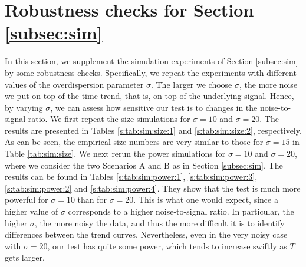 \documentclass[a4paper,12pt]{article}
\numberwithin{equation}{section}
\begin{document}
\section{Robustness checks for Section \ref{subsec:sim}}\label{s:subsec:robustness}


{\color{red} In this section,} we supplement the simulation experiments of Section \ref{subsec:sim} by some robustness checks. Specifically, we repeat the experiments with different values of the overdispersion parameter $\sigma$. The larger we choose $\sigma$, the more noise we put on top of the time trend, that is, on top of the underlying signal. Hence, by varying $\sigma$, we can assess how sensitive our test is to changes in the noise-to-signal ratio. We first repeat the size simulations for $\sigma = 10$ and $\sigma = 20$. The results are presented in Tables \ref{s:tab:sim:size:1} and \ref{s:tab:sim:size:2}, respectively. As can be seen, the empirical size numbers are very similar to those for $\sigma=15$ in Table \ref{tab:sim:size}. We next rerun the power simulations for $\sigma = 10$ and $\sigma = 20$, where we consider the two Scenarios A and B as in Section \ref{subsec:sim}. The results can be found {\color{red} in Tables \ref{s:tab:sim:power:1}, \ref{s:tab:sim:power:3}, \ref{s:tab:sim:power:2} and \ref{s:tab:sim:power:4}}. They show that the test is much more powerful for $\sigma=10$ than for $\sigma=20$. This is what one would expect, since a higher value of $\sigma$ corresponds to a higher noise-to-signal ratio. In particular, the higher $\sigma$, the more noisy the data, and thus the more difficult it is to identify differences between the trend curves. Nevertheless, even in the very noisy case with $\sigma = 20$, our test has quite some power, which tends to increase swiftly as $T$ gets larger. 
\end{document}
